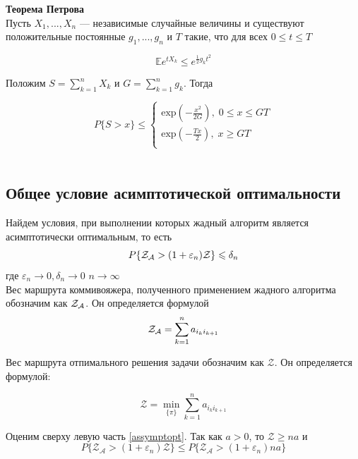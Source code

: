 \documentclass[a4paper, 14pt]{extarticle}
\numberwithin{equation}{section}
\begin{document}
\textbf{Теорема Петрова} \\

Пусть $X_1,...,X_n$ — независимые случайные величины и
существуют положительные постоянные $g_1,...,g_n$ и $T$ такие, что для всех $0 \leqslant t \leqslant T$

\begin{equation}
\mathbb {E}e^{tX_k} \leqslant e^{\frac{1}{2} g_k t^{2}}
\end{equation}

Положим $S=\sum_{k=1}^{n} X_k $ и $G=\sum_{k=1}^{n} g_k $. Тогда

\begin{equation}
P\{S > x\} \leqslant 
\begin{cases}
   \mathrm{exp} (-\frac{x^{2}}{2G}), \; 0 \leqslant x \leqslant GT\\
   \mathrm{exp} (-\frac{Tx}{2}), \; x\geqslant GT \\
 \end{cases}
\end{equation}\\


\subsection{Общее условие асимптотической оптимальности}

Найдем условия, при выполнении которых жадный алгоритм является асимптотически оптимальным, то есть
\begin{equation}\label{assymptopt}
P\{\text{$\mathcal{Z_{A}}$} > (1+\varepsilon_n)\mathcal{Z}\}\leqslant \delta_n
\end{equation}
где $\varepsilon_n \rightarrow 0, \delta_n \rightarrow 0$ $n \rightarrow \infty$\\

Вес маршрута коммивояжера, полученного применением жадного алгоритма обозначим как $\text{$\mathcal{Z_{A}}$}$. Он определяется формулой
\begin{equation}
\text{$\mathcal{Z_{A}}$} = \sum_{k=1}^n a_{i_k i_{k+1}}
\end{equation}

Вес маршрута отпимального решения задачи обозначим как $\mathcal{Z}$. Он определяется формулой:

\begin{equation}
\mathcal{Z} = \min_{\{ \pi \}} \sum_{k=1}^n a_{i_k i_{k+1}}
\end{equation}


Оценим сверху левую часть \eqref{assymptopt}. Так как $a>0$, то $\mathcal{Z} \geqslant na$ и 
\begin{equation}\label{4}
P\{\mathcal{Z_{A}} > (1+\varepsilon_n)\mathcal{Z}\}\leqslant P\{\mathcal{Z_{A}} > (1+\varepsilon_n)na\}
\end{equation}
\end{document}
